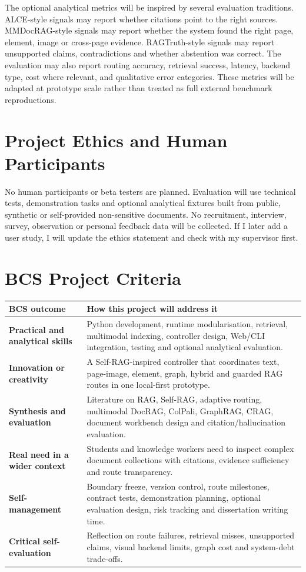 \documentclass{article}
\begin{document}
The optional analytical metrics will be inspired by several evaluation traditions. ALCE-style signals may report whether citations point to the right sources. MMDocRAG-style signals may report whether the system found the right page, element, image or cross-page evidence. RAGTruth-style signals may report unsupported claims, contradictions and whether abstention was correct. The evaluation may also report routing accuracy, retrieval success, latency, backend type, cost where relevant, and qualitative error categories. These metrics will be adapted at prototype scale rather than treated as full external benchmark reproductions.

\section{Project Ethics and Human Participants}

No human participants or beta testers are planned. Evaluation will use technical tests, demonstration tasks and optional analytical fixtures built from public, synthetic or self-provided non-sensitive documents. No recruitment, interview, survey, observation or personal feedback data will be collected. If I later add a user study, I will update the ethics statement and check with my supervisor first.

\section{BCS Project Criteria}

\begin{tabularx}{\textwidth}{>{\bfseries}p{}X}
\toprule
BCS outcome & How this project will address it \\
\midrule
Practical and analytical skills & Python development, runtime modularisation, retrieval, multimodal indexing, controller design, Web/CLI integration, testing and optional analytical evaluation. \\
Innovation or creativity & A Self-RAG-inspired controller that coordinates text, page-image, element, graph, hybrid and guarded RAG routes in one local-first prototype. \\
Synthesis and evaluation & Literature on RAG, Self-RAG, adaptive routing, multimodal DocRAG, ColPali, GraphRAG, CRAG, document workbench design and citation/hallucination evaluation. \\
Real need in a wider context & Students and knowledge workers need to inspect complex document collections with citations, evidence sufficiency and route transparency. \\
Self-management & Boundary freeze, version control, route milestones, contract tests, demonstration planning, optional evaluation design, risk tracking and dissertation writing time. \\
Critical self-evaluation & Reflection on route failures, retrieval misses, unsupported claims, visual backend limits, graph cost and system-debt trade-offs. \\
\bottomrule
\end{tabularx}
\end{document}
